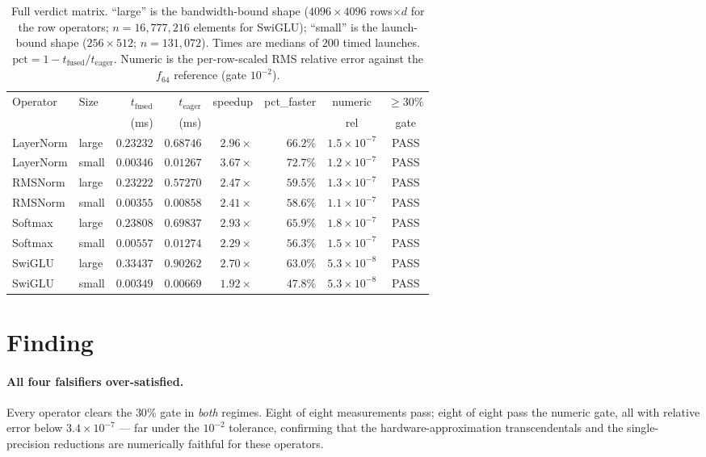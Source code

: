 \documentclass[11pt,a4paper]{article}
\begin{document}
\begin{table}[t]
\centering
\caption{Full verdict matrix. ``large'' is the bandwidth-bound shape
($4096\times4096$ rows$\times d$ for the row operators; $n=16{,}777{,}216$
elements for SwiGLU); ``small'' is the launch-bound shape ($256\times512$;
$n=131{,}072$). Times are medians of $200$ timed launches.
$\text{pct} = 1 - t_{\text{fused}}/t_{\text{eager}}$. Numeric is the
per-row-scaled RMS relative error against the $f_{64}$ reference (gate
$10^{-2}$).}
\label{tab:results}
\small
\begin{tabular}{llrrrrcc}
\toprule
Operator & Size & $t_{\text{fused}}$ & $t_{\text{eager}}$ & speedup & pct\_faster & numeric & $\ge 30\%$ \\
         &      & (ms) & (ms) & & & rel & gate \\
\midrule
LayerNorm & large & $0.23232$ & $0.68746$ & $2.96\times$ & $\mathbf{66.2\%}$ & $1.5\!\times\!10^{-7}$ & PASS \\
LayerNorm & small & $0.00346$ & $0.01267$ & $3.67\times$ & $\mathbf{72.7\%}$ & $1.2\!\times\!10^{-7}$ & PASS \\
RMSNorm   & large & $0.23222$ & $0.57270$ & $2.47\times$ & $\mathbf{59.5\%}$ & $1.3\!\times\!10^{-7}$ & PASS \\
RMSNorm   & small & $0.00355$ & $0.00858$ & $2.41\times$ & $\mathbf{58.6\%}$ & $1.1\!\times\!10^{-7}$ & PASS \\
Softmax   & large & $0.23808$ & $0.69837$ & $2.93\times$ & $\mathbf{65.9\%}$ & $1.8\!\times\!10^{-7}$ & PASS \\
Softmax   & small & $0.00557$ & $0.01274$ & $2.29\times$ & $\mathbf{56.3\%}$ & $1.5\!\times\!10^{-7}$ & PASS \\
SwiGLU    & large & $0.33437$ & $0.90262$ & $2.70\times$ & $\mathbf{63.0\%}$ & $5.3\!\times\!10^{-8}$ & PASS \\
SwiGLU    & small & $0.00349$ & $0.00669$ & $1.92\times$ & $\mathbf{47.8\%}$ & $5.3\!\times\!10^{-8}$ & PASS \\
\bottomrule
\end{tabular}
\end{table}

\section{Finding}
\label{sec:finding}

\paragraph{All four falsifiers over-satisfied.} Every operator clears the
$30\%$ gate in \emph{both} regimes. Eight of eight measurements pass; eight of
eight pass the numeric gate, all with relative error below
$3.4\times 10^{-7}$ --- far under the $10^{-2}$ tolerance, confirming that the
hardware-approximation transcendentals and the single-precision reductions are
numerically faithful for these operators.
\end{document}
